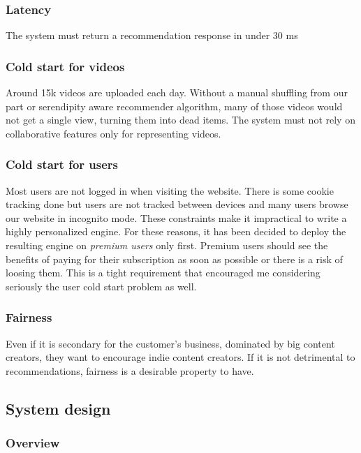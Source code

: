 \subsubsection{Latency}
The system must return a recommendation response in under 30 ms

\subsubsection{Cold start for videos}
Around 15k videos are uploaded each day. Without a manual shuffling from our part or serendipity aware recommender algorithm, many of those videos would not get a single view, turning them into dead items. The system must not rely on collaborative features only for representing videos.

\subsubsection{Cold start for users}
Most users are not logged in when visiting the website. There is some cookie tracking done but users are not tracked between devices and many users browse our website in incognito mode. These constraints make it impractical to write a highly personalized engine. For these reasons, it has been decided to deploy the resulting engine on \emph{premium users} only first. Premium users should see the benefits of paying for their subscription as soon as possible or there is a risk of loosing them. This is a tight requirement that encouraged me considering seriously the user cold start problem as well.

\subsubsection{Fairness}
Even if it is secondary for the customer's business, dominated by big content creators, they want to encourage indie content creators. If it is not detrimental to recommendations, fairness is a desirable property to have.

\subsection{System design}

\subsubsection{Overview}

